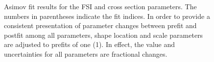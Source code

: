 \begin{figure}
\begin{centering}
\par\end{centering}
\begin{centering}
\par\end{centering}
\caption[Asimov Fit Results for the Cross Section and FSI Parameters]{Asimov fit results for the FSI and cross section parameters. The numbers
in parentheses indicate the fit indices. In order to provide a consistent
presentation of parameter changes between prefit and postfit among
all parameters, shape location and scale parameters are adjusted to
prefits of one (1). In effect, the value and uncertainties for all
parameters are fractional changes. \label{fig:Asimov-fit-resultsXSEC}}
\end{figure}


